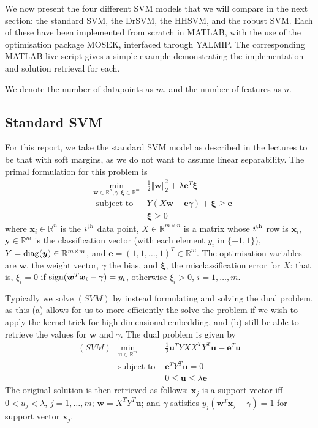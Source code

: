 \documentclass[11pt]{article}
\newcommand{\ds}{\displaystyle}
\begin{document}
We now present the four different SVM models that we will compare in the next section: the standard SVM, the DrSVM, the HHSVM, and the robust SVM. Each of these have been implemented from scratch in MATLAB, with the use of the optimisation package MOSEK, interfaced through YALMIP. The corresponding MATLAB live script gives a simple example demonstrating the implementation and solution retrieval for each.

We denote the number of datapoints as $m$, and the number of features as $n$. 

\subsection{Standard SVM}

For this report, we take the standard SVM model as described in the lectures to be that with soft margins, as we do not want to assume linear separability. The primal formulation for this problem is
\begin{eqnarray*}
& \ds \min_{\pmb{w}\in\mathbb{R}^n,\gamma,\pmb{\xi}\in\mathbb{R}^m} & \frac{1}{2}\Vert \bm{w} \Vert_2^2  + \lambda\bm{e}^T\bm{\xi} 
\\
& \mbox{ subject to } & Y(X\bm{w} - \bm{e}\gamma) + \bm{\xi} \geq \bm{e} 
\\
& & \bm{\xi} \geq 0
\end{eqnarray*}
where $\bm{x}_i\in\mathbb{R}^n$ is the $i^{\rm th}$ data point, $X\in\mathbb{R}^{m\times n}$ is a matrix whose $i^{\rm th}$ row is $\bm{x}_i$, $\bm{y}\in\mathbb{R}^m$ is the classification vector (with each element $y_i$ in $\{-1, 1\}$), $Y = {\rm diag}(\bm{y})\in\mathbb{R}^{m\times m}$, and $\bm{e} = (1, 1, \dots, 1)^T\in\mathbb{R}^{m}$. The optimisation variables are $\bm{w}$, the weight vector, $\gamma$ the bias, and $\bm{\xi}$, the misclassification error for $X$: that is, $\xi_i = 0$ if ${\rm sign}(\bm{w}^T\bm{x}_i - \gamma) = y_i$, otherwise $\xi_i > 0$, $i=1,\dots,m$. 

Typically we solve $(SVM)$ by instead formulating and solving the dual problem, as this (a) allows for us to more efficiently the solve the problem if we wish to apply the kernel trick for high-dimensional embedding, and (b) still be able to retrieve the values for $\bm{w}$ and $\gamma$. The dual problem is given by
\begin{eqnarray*}
(SVM) & \ds\min_{\pmb{u}\in\mathbb{R}^m} & \frac{1}{2} \bm{u}^TYXX^TY^T\bm{u} - \bm{e}^T\bm{u}
\\
& \mbox{subject to } & \bm{e}^TY^T\bm{u} = 0
\\
& & 0 \leq \bm{u} \leq \lambda\bm{e}
\end{eqnarray*}
The original solution is then retrieved as follows: $\bm{x}_j$ is a support vector iff $0 < u_j < \lambda$, $j=1,\dots,m$; $\bm{w} = X^TY^T\bm{u}$; and $\gamma$ satisfies $y_j(\bm{w}^T\bm{x}_j - \gamma) = 1$ for support vector $\bm{x}_j$. 
\end{document}
